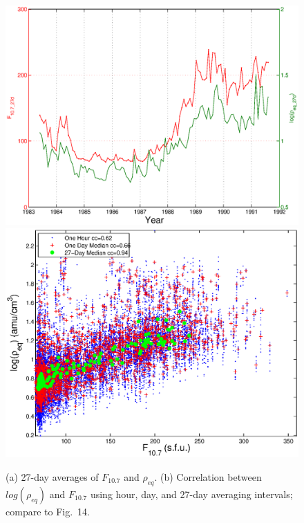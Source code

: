 \documentclass[10pt,twocolumn]{article}
\begin{document}
\begin{figure}[htp!]
\centering
\subcaptionbox{\label{ccplot:a}}
{\includegraphics[scale=0.40]{paperfigures/F107MDAllData.eps}}
\subcaptionbox{\label{ccplot:b}}
{\includegraphics[scale=0.40]{paperfigures/ccplot.eps}}
\caption{(a) 27-day averages of $F_{10.7}$ and $\rho_{eq}$. (b) Correlation between $log(\rho_{eq})$ and $F_{10.7}$ using hour, day, and 27-day averaging intervals; compare to \cite{Takahashi2010} Fig.~14.}
\label{ccplot}
\end{figure}
\clearpage
\end{document}
